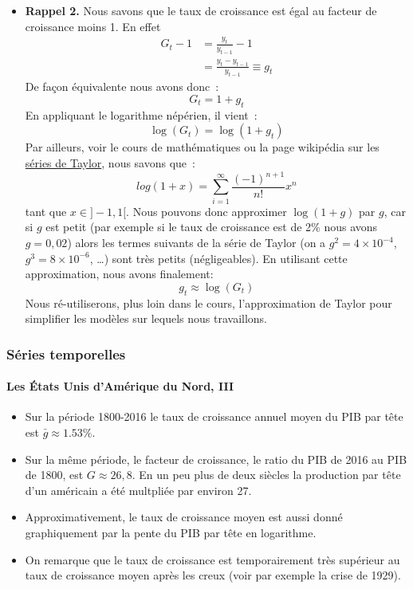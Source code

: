 \documentclass[10pt,notheorems]{beamer}
\theoremstyle{plain}
\theoremstyle{definition} %
\newenvironment{notes}
{\bgroup \justifying\bgroup\tiny\begin{spacing}{1.0}}
  {\end{spacing}\egroup\egroup}
\begin{document}
\begin{notes}
  \begin{itemize}

  \item \textbf{Rappel 2.} Nous savons que le taux de croissance est égal au facteur de croissance moins 1. En effet
    \[
      \begin{split}
        G_t-1 &= \frac{y_t}{y_{t-1}}-1\\
        &= \frac{y_t-y_{t-1}}{y_{t-1}} \equiv g_t
      \end{split}
    \]
    De façon équivalente nous avons donc~:
    \[
      G_t = 1+g_t
    \]
    En appliquant le logarithme népérien, il vient~:
    \[
      \log (G_t) = \log(1+g_t)
    \]
    Par ailleurs, voir le cours de mathématiques ou la page wikipédia sur les \href{https://fr.wikipedia.org/wiki/S%C3%A9rie_de_Taylor}{séries de Taylor}, nous savons que~:
    \[
      log(1+x) = \sum_{i=1}^{\infty}\frac{(-1)^{n+1}}{n!}x^n
    \]
    tant que $x\in]-1,1[$. Nous pouvons donc approximer $\log(1+g)$ par $g$, car si $g$ est petit (par exemple si le taux de croissance est de 2\% nous avons $g=0,02$) alors les termes suivants de la série de Taylor (on a $g^2=4\times 10^{-4}$, $g^3 = 8\times 10^{-6}$, \ldots) sont très petits (négligeables). En utilisant cette approximation, nous avons finalement:
    \[
      g_t \approx \log(G_t)
    \]
    Nous ré-utiliserons, plus loin dans le cours, l'approximation de Taylor pour simplifier les modèles sur lequels nous travaillons.
  \end{itemize}
\end{notes}



\begin{frame}
  \frametitle{Séries temporelles}
  \framesubtitle{Les États Unis d'Amérique du Nord, III}

  \begin{itemize}
  \item Sur la période 1800-2016 le taux de croissance annuel moyen du PIB par tête est $\bar g \approx 1.53\%$.\newline

  \item Sur la même période, le facteur de croissance, le ratio du PIB de 2016 au PIB de 1800, est $G \approx 26,8$. En un peu plus de deux siècles la production par tête d'un américain a été multpliée par environ 27.\newline

  \item Approximativement, le taux de croissance moyen est aussi donné graphiquement par la pente du PIB par tête en logarithme.\newline

  \item On remarque que le taux de croissance est temporairement très supérieur au taux de croissance moyen après les creux (voir par exemple la crise de 1929).
  \end{itemize}

\end{frame}
\end{document}
